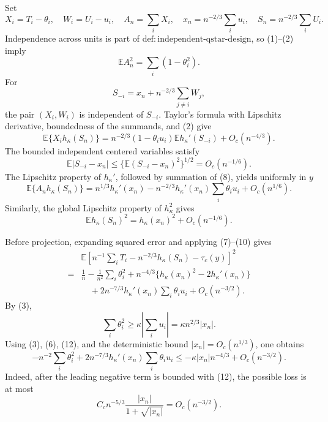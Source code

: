 Set
\[
X_i=T_i-\theta_i,\quad W_i=U_i-u_i,\quad
A_n=\sum_iX_i,\quad x_n=n^{-2/3}\sum_i u_i,\quad
S_n=n^{-2/3}\sum_iU_i.
\]
Independence across units is part of
\(\mathrm{def:independent\text{-}qstar\text{-}design}\), so (1)--(2) imply
\[
\mathbb EA_n^2=\sum_i(1-\theta_i^2).
\tag{7}
\]
For
\[
S_{-i}=x_n+n^{-2/3}\sum_{j\ne i}W_j,
\]
the pair \((X_i,W_i)\) is independent of \(S_{-i}\).  Taylor's formula with Lipschitz derivative, boundedness of the summands, and (2) give
\[
\mathbb E\{X_ih_\kappa(S_n)\}
=n^{-2/3}(1-\theta_iu_i)\mathbb Eh_\kappa'(S_{-i})
+O_c(n^{-4/3}).
\tag{8}
\]
The bounded independent centered variables satisfy
\[
\mathbb E|S_{-i}-x_n|
\le\{\mathbb E(S_{-i}-x_n)^2\}^{1/2}=O_c(n^{-1/6}).
\]
The Lipschitz property of \(h_\kappa'\), followed by summation of (8), yields uniformly in \(y\)
\[
\mathbb E\{A_nh_\kappa(S_n)\}
=n^{1/3}h_\kappa'(x_n)
-n^{-2/3}h_\kappa'(x_n)\sum_i\theta_iu_i
+O_c(n^{1/6}).
\tag{9}
\]
Similarly, the global Lipschitz property of \(h_\kappa^2\) gives
\[
\mathbb Eh_\kappa(S_n)^2
=h_\kappa(x_n)^2+O_c(n^{-1/6}).
\tag{10}
\]

Before projection, expanding squared error and applying (7)--(10) gives
\[
\begin{split}
&\mathbb E\left[
n^{-1}\sum_iT_i-n^{-2/3}h_\kappa(S_n)-\tau_c(y)
\right]^2\\
={}&\frac1n-\frac1{n^2}\sum_i\theta_i^2
+n^{-4/3}\{h_\kappa(x_n)^2-2h_\kappa'(x_n)\}\\
&\quad
+2n^{-7/3}h_\kappa'(x_n)\sum_i\theta_iu_i
+O_c(n^{-3/2}).
\end{split}
\tag{11}
\]
By (3),
\[
\sum_i\theta_i^2
\ge\kappa\left|\sum_i u_i\right|
=\kappa n^{2/3}|x_n|.
\tag{12}
\]
Using (3), (6), (12), and the deterministic bound
\(|x_n|=O_c(n^{1/3})\), one obtains
\[
-n^{-2}\sum_i\theta_i^2
+2n^{-7/3}h_\kappa'(x_n)\sum_i\theta_iu_i
\le-\kappa|x_n|n^{-4/3}+O_c(n^{-3/2}).
\tag{13}
\]
Indeed, after the leading negative term is bounded with (12), the possible loss is at most
\[
C_cn^{-5/3}\frac{|x_n|}{1+\sqrt{|x_n|}}
=O_c(n^{-3/2}).
\]

